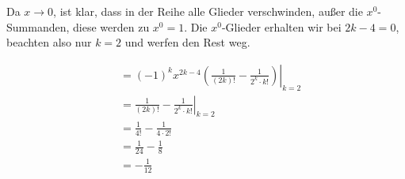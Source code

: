\documentclass[a4paper,german,12pt,smallheadings]{scrartcl}
\begin{document}
Da $x \to 0$, ist klar, dass in der Reihe alle Glieder verschwinden, außer die
$x^0$-Summanden, diese werden zu $x^0 = 1$. Die $x^0$-Glieder erhalten wir bei
$2k-4 = 0$, beachten also nur $k=2$ und werfen den Rest weg.

\begin{align*}
   &= \left.(-1)^k x^{2k-4} \left(\frac{1}{(2k)!} - \frac{1}{2^k \cdot k!}\right)\right|_{k=2} \\
   &= \left.\frac{1}{(2k)!} - \frac{1}{2^k \cdot k!}\right|_{k=2} \\
   &= \frac{1}{4!} - \frac{1}{4\cdot 2!} \\
   &= \frac{1}{24} - \frac{1}{8} \\
   &= -\frac{1}{12}
\end{align*}
\end{document}
